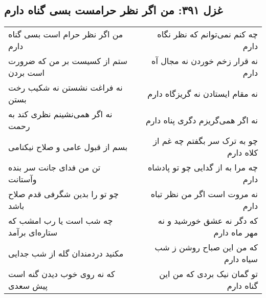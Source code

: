 \begin{center}
\section*{غزل ۳۹۱: من اگر نظر حرامست بسی گناه دارم}
\label{sec:391}
\begin{longtable}{l p{0.5cm} r}
من اگر نظر حرام است بسی گناه دارم
&&
چه کنم نمی‌توانم که نظر نگاه دارم
\\
ستم از کسیست بر من که ضرورت است بردن
&&
نه قرار زخم خوردن نه مجال آه دارم
\\
نه فراغت نشستن نه شکیب رخت بستن
&&
نه مقام ایستادن نه گریزگاه دارم
\\
نه اگر همی‌نشینم نظری کند به رحمت
&&
نه اگر همی‌گریزم دگری پناه دارم
\\
بسم از قبول عامی و صلاح نیکنامی
&&
چو به ترک سر بگفتم چه غم از کلاه دارم
\\
تن من فدای جانت سر بنده وآستانت
&&
چه مرا به از گدایی چو تو پادشاه دارم
\\
چو تو را بدین شگرفی قدم صلاح باشد
&&
نه مروت است اگر من نظر تباه دارم
\\
چه شب است یا رب امشب که ستاره‌ای برآمد
&&
که دگر نه عشق خورشید و نه مهر ماه دارم
\\
مکنید دردمندان گله از شب جدایی
&&
که من این صباح روشن ز شب سیاه دارم
\\
که نه روی خوب دیدن گنه است پیش سعدی
&&
تو گمان نیک بردی که من این گناه دارم
\\
\end{longtable}
\end{center}
